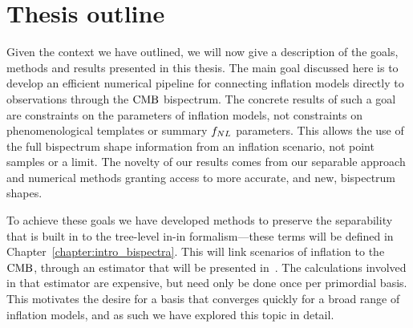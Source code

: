     




\section{Thesis outline}
Given the context we have outlined,
    we will now give a description of the goals, methods
    and results presented in this thesis.
    The main goal discussed here is to develop an efficient numerical pipeline for
    connecting inflation models directly to observations through the $\text{CMB}$ bispectrum.
    The concrete results of such a goal are constraints on the parameters of inflation models,
    not constraints on phenomenological templates or summary $f_{NL}$ parameters.
    This allows the use of the full bispectrum shape information from an inflation scenario,
    not point samples or a limit. The novelty of our results comes from our separable
    approach and numerical methods
    granting access to more accurate, and new, bispectrum shapes.


    To achieve these goals we have developed methods to preserve the
    separability that is built in to the tree-level in-in formalism---these
    terms will be defined in Chapter~\ref{chapter:intro_bispectra}.
    This will link scenarios of inflation to the $\text{CMB}$,
    through an estimator that will be presented in~\cite{Sohn_2021}.
    The calculations involved in that estimator are expensive,
    but need only be done once per primordial basis.
    This motivates the desire for a basis that converges quickly for a broad range of inflation models,
    and as such we have explored this topic in detail.


